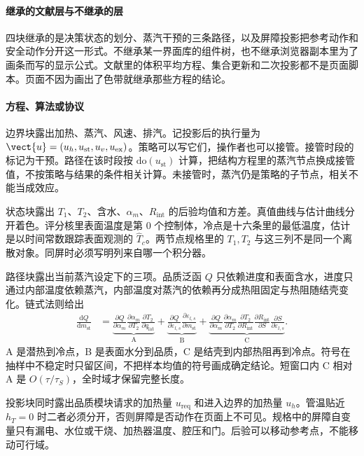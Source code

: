 \paragraph{继承的文献层与不继承的层}
四块继承的是决策状态的划分、蒸汽干预的三条路径，以及屏障投影把参考动作和安全动作分开这一形式。不继承某一界面库的组件树，也不继承浏览器副本里为了画条而写的显示公式。文献里的体积平均方程、集合更新和二次投影都不是页面脚本。页面不因为画出了色带就继承那些方程的结论。

\paragraph{方程、算法或协议}
边界块露出加热、蒸汽、风速、排汽。记投影后的执行量为 $\vect{u}=(u_h,u_{\mathrm{st}},u_v,u_{\mathrm{ex}})$。策略可以写它们，操作者也可以接管。接管时段的标记为干预。路径在该时段按 $\mathrm{do}(u_{\mathrm{st}})$ 计算，把结构方程里的蒸汽节点换成接管值，不按策略与结果的条件相关计算。未接管时，蒸汽仍是策略的子节点，相关不能当成效应。

状态块露出 $T_1$、$T_2$、含水、$\alpha_m$、$R_{\mathrm{int}}$ 的后验均值和方差。真值曲线与估计曲线分开着色。评分核里表面温度是第 0 个控制体，冷点是十六条里的最低温度，估计是以时间常数跟踪表面观测的 $\widehat T_c$。两节点规格里的 $T_1,T_2$ 与这三列不是同一个离散对象。同屏时必须写明列来自哪一个积分器。

路径块露出当前蒸汽设定下的三项。品质泛函 $Q$ 只依赖进度和表面含水，进度只通过内部温度依赖蒸汽，内部温度对蒸汽的依赖再分成热阻固定与热阻随结壳变化。链式法则给出
\begin{align*}
\frac{\mathrm{d}Q}{\mathrm{d}m_{\mathrm{st}}}
&=
\underbrace{\frac{\partial Q}{\partial\alpha_m}\frac{\partial\alpha_m}{\partial T_2}\frac{\partial T_2}{\partial q_{\mathrm{lat}}}}_{\mathrm{A}}
+
\underbrace{\frac{\partial Q}{\partial\varepsilon_{l,s}}\frac{\partial\varepsilon_{l,s}}{\partial m_{\mathrm{st}}}}_{\mathrm{B}}
+
\underbrace{\frac{\partial Q}{\partial\alpha_m}\frac{\partial\alpha_m}{\partial T_2}\frac{\partial T_2}{\partial R_{\mathrm{int}}}\frac{\partial R_{\mathrm{int}}}{\partial S}\frac{\partial S}{\partial\varepsilon_{l,s}}}_{\mathrm{C}}.
\end{align*}
A 是潜热到冷点，B 是表面水分到品质，C 是结壳到内部热阻再到冷点。符号在抽样中不稳定时只留区间，不把样本均值的符号画成确定结论。短窗口内 C 相对 A 是 $O(\tau/\tau_S)$，全时域才保留完整长度。

投影块同时露出品质模块请求的加热量 $u_{\mathrm{req}}$ 和进入边界的加热量 $u_h$。管温贴近 $h_T=0$ 时二者必须分开，否则屏障是否动作在页面上不可见。规格中的屏障自变量只有漏电、水位或干烧、加热器温度、腔压和门。后验可以移动参考点，不能移动可行域。

